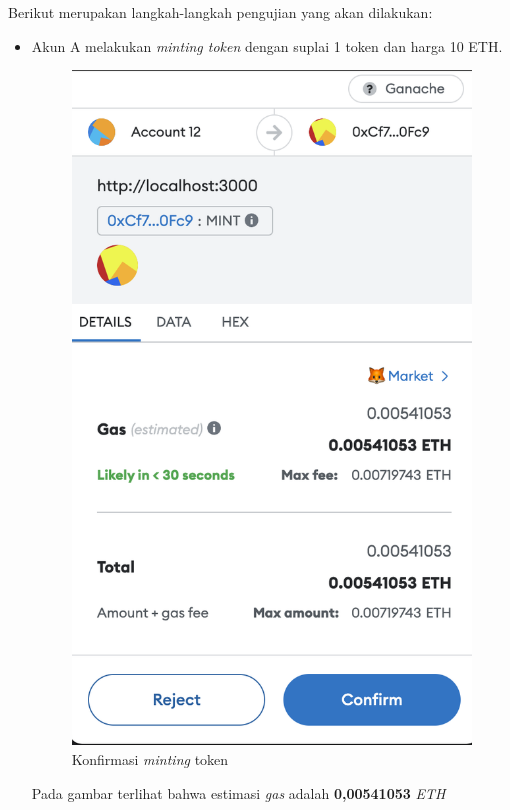 Berikut merupakan langkah-langkah pengujian yang akan dilakukan:
  \begin{itemize}
      \item Akun A melakukan \emph{minting token} dengan suplai 1 token dan harga 10 ETH.
      \begin{figure} [H] \centering
          \includegraphics[scale=0.4]{gambar/img-test-rent-mint-1.png}
          \caption{Konfirmasi \emph{minting} token}
          \label{fig:TestRentKonfirmasiMintingToken}
        \end{figure}
      Pada gambar terlihat bahwa estimasi \emph{gas} adalah \textbf{0,00541053} \emph{ETH}

\end{itemize}
